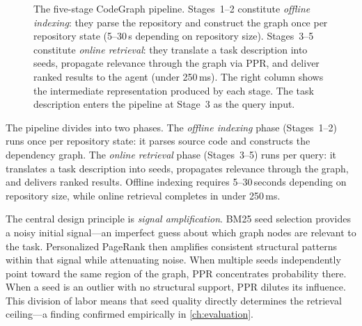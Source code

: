 \begin{figure}[H]
    \caption[CodeGraph pipeline architecture]{The five-stage CodeGraph pipeline. Stages~1--2 constitute \emph{offline indexing}: they parse the repository and construct the graph once per repository state (5--30\,s depending on repository size). Stages~3--5 constitute \emph{online retrieval}: they translate a task description into seeds, propagate relevance through the graph via PPR, and deliver ranked results to the agent (under 250\,ms). The right column shows the intermediate representation produced by each stage. The task description enters the pipeline at Stage~3 as the query input.}
    \label{fig:pipeline-architecture}
\end{figure}

The pipeline divides into two phases. The \emph{offline indexing} phase (Stages~1--2) runs once per repository state: it parses source code and constructs the dependency graph. The \emph{online retrieval} phase (Stages~3--5) runs per query: it translates a task description into seeds, propagates relevance through the graph, and delivers ranked results. Offline indexing requires 5--30\,seconds depending on repository size, while online retrieval completes in under 250\,ms.

The central design principle is \emph{signal amplification}. BM25 seed selection provides a noisy initial signal---an imperfect guess about which graph nodes are relevant to the task. Personalized PageRank then amplifies consistent structural patterns within that signal while attenuating noise. When multiple seeds independently point toward the same region of the graph, PPR concentrates probability there. When a seed is an outlier with no structural support, PPR dilutes its influence. This division of labor means that seed quality directly determines the retrieval ceiling---a finding confirmed empirically in \cref{ch:evaluation}.

